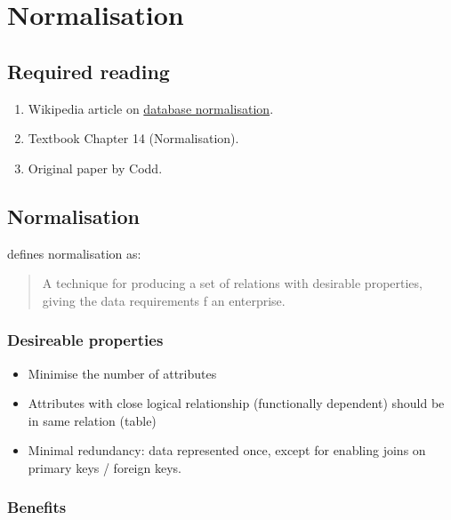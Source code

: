 \chapter{Normalisation}
\label{ch:normalisation}

\section{Required reading}\label{required-reading}

\begin{enumerate}
\item
  Wikipedia article on
  \href{https://en.wikipedia.org/wiki/Database_normalization}{database
  normalisation}.
\item
  Textbook \citep{connolly:2015:database} Chapter 14 (Normalisation).
\item
  Original paper by Codd.
\end{enumerate}

\section{Normalisation}\label{normalisation}

\citet{connolly:2015:database} defines normalisation as:

\begin{quote}
A technique for producing a set of relations with desirable properties,
giving the data requirements f an enterprise.
\end{quote}

\subsection{Desireable properties}

\begin{itemize}
\item
  Minimise the number of attributes
\item
  Attributes with close logical relationship (functionally dependent)
  should be in same relation (table)
\item
  Minimal redundancy: data represented once, except for enabling joins
  on primary keys / foreign keys.
\end{itemize}

\subsection{Benefits}

